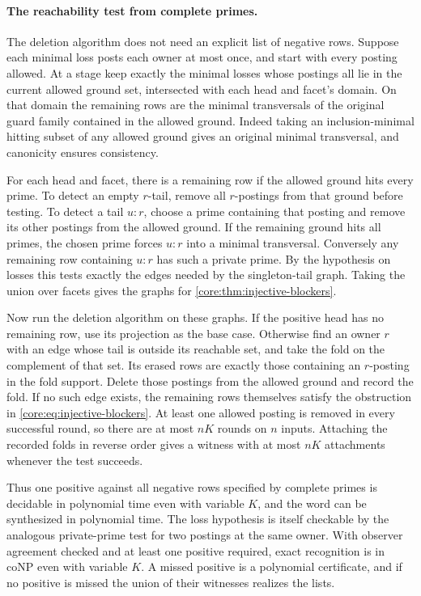 \paragraph{The reachability test from complete primes.}
The deletion algorithm does not need an explicit list of
negative rows. Suppose each minimal loss posts each owner
at most once, and start with every posting allowed. At a
stage keep exactly the minimal losses whose postings all
lie in the current allowed ground set, intersected with
each head and facet's domain. On that domain the remaining
rows are the minimal transversals of the original guard
family contained in the allowed ground. Indeed taking an
inclusion-minimal hitting subset of any allowed ground
gives an original minimal transversal, and canonicity
ensures consistency.

For each head and facet, there is a remaining row if the
allowed ground hits every prime. To detect an empty
$r$-tail, remove all $r$-postings from that ground before
testing. To detect a tail $u:r$, choose a prime containing
that posting and remove its other postings from the
allowed ground. If the remaining ground hits all primes,
the chosen prime forces $u:r$ into a minimal transversal.
Conversely any remaining row containing $u:r$ has such
a private prime. By the hypothesis on losses this tests
exactly the edges needed by the singleton-tail graph.
Taking the union over facets gives the graphs for
\cref{core:thm:injective-blockers}.

Now run the deletion algorithm on these graphs. If the
positive head has no remaining row, use its projection
as the base case. Otherwise find an owner $r$ with an
edge whose tail is outside its reachable set, and take
the fold on the complement of that set. Its erased rows
are exactly those containing an $r$-posting in the fold
support. Delete those postings from the allowed ground
and record the fold. If no such edge exists, the remaining
rows themselves satisfy the obstruction in
\cref{core:eq:injective-blockers}. At least one allowed
posting is removed in every successful round, so there
are at most $nK$ rounds on $n$ inputs. Attaching the
recorded folds in reverse order gives a witness with at
most $nK$ attachments whenever the test succeeds.

Thus one positive against all negative rows specified
by complete primes is decidable in polynomial time even
with variable $K$, and the word can be synthesized in
polynomial time. The loss hypothesis is itself checkable
by the analogous private-prime test for two postings at
the same owner. With observer agreement checked and at
least one positive required, exact recognition is in
coNP even with variable $K$. A missed positive is a
polynomial certificate, and if no positive is missed
the union of their witnesses realizes the lists.

